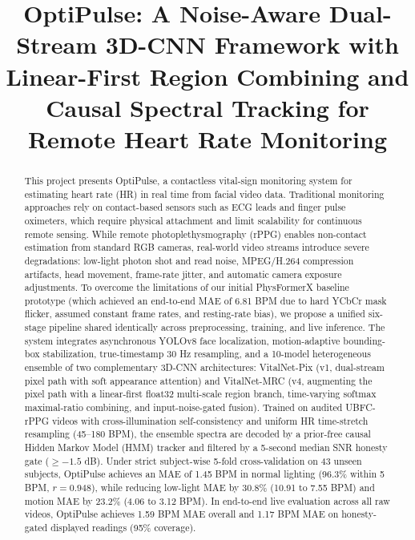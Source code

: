 \documentclass[conference]{IEEEtran}
\begin{document}
\title{OptiPulse: A Noise-Aware Dual-Stream 3D-CNN Framework with Linear-First Region Combining and Causal Spectral Tracking for Remote Heart Rate Monitoring}

\author{
}

\maketitle

\begin{abstract}
This project presents OptiPulse, a contactless vital-sign monitoring system for estimating heart rate (HR) in real time from facial video data. Traditional monitoring approaches rely on contact-based sensors such as ECG leads and finger pulse oximeters, which require physical attachment and limit scalability for continuous remote sensing. While remote photoplethysmography (rPPG) enables non-contact estimation from standard RGB cameras, real-world video streams introduce severe degradations: low-light photon shot and read noise, MPEG/H.264 compression artifacts, head movement, frame-rate jitter, and automatic camera exposure adjustments. To overcome the limitations of our initial PhysFormerX baseline prototype (which achieved an end-to-end MAE of 6.81 BPM due to hard YCbCr mask flicker, assumed constant frame rates, and resting-rate bias), we propose a unified six-stage pipeline shared identically across preprocessing, training, and live inference. The system integrates asynchronous YOLOv8 face localization, motion-adaptive bounding-box stabilization, true-timestamp 30 Hz resampling, and a 10-model heterogeneous ensemble of two complementary 3D-CNN architectures: VitalNet-Pix (v1, dual-stream pixel path with soft appearance attention) and VitalNet-MRC (v4, augmenting the pixel path with a linear-first float32 multi-scale region branch, time-varying softmax maximal-ratio combining, and input-noise-gated fusion). Trained on audited UBFC-rPPG videos with cross-illumination self-consistency and uniform HR time-stretch resampling (45--180 BPM), the ensemble spectra are decoded by a prior-free causal Hidden Markov Model (HMM) tracker and filtered by a 5-second median SNR honesty gate ($\ge -1.5$ dB). Under strict subject-wise 5-fold cross-validation on 43 unseen subjects, OptiPulse achieves an MAE of 1.45 BPM in normal lighting (96.3\% within 5 BPM, $r = 0.948$), while reducing low-light MAE by 30.8\% (10.91 to 7.55 BPM) and motion MAE by 23.2\% (4.06 to 3.12 BPM). In end-to-end live evaluation across all raw videos, OptiPulse achieves 1.59 BPM MAE overall and 1.17 BPM MAE on honesty-gated displayed readings (95\% coverage).
\end{abstract}
\end{document}
